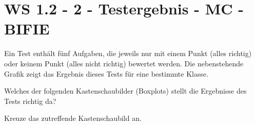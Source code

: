 \section{WS 1.2 - 2 - Testergebnis - MC - BIFIE}

\begin{beispiel}[WS 1.2]{1} %

				\begin{minipage}[t]{0.5\textwidth}
				Ein Test enthält fünf Aufgaben, die jeweils nur mit einem Punkt (alles richtig) oder keinem Punkt (alles nicht richtig) bewertet werden. Die nebenstehende Grafik zeigt das Ergebnis dieses Tests für eine bestimmte Klasse.\leer
				
				Welches der folgenden Kastenschaubilder (Boxplots) stellt die Ergebnisse des Tests richtig da?\leer
				
				Kreuze das zutreffende Kastenschaubild an.
				\end{minipage}
				\begin{minipage}[t]{0.4\textwidth}
				\begin{center}~
				

\end{center}
\end{minipage}
\end{beispiel}
